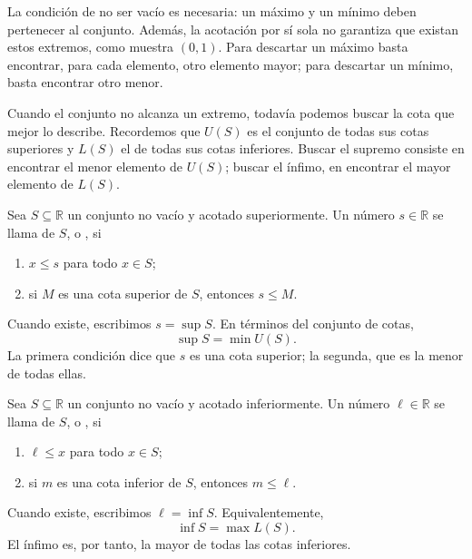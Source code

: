 \begin{remark}
La condición de no ser vacío es necesaria: un máximo y un mínimo deben pertenecer al conjunto. Además, la acotación por sí sola no garantiza que existan estos extremos, como muestra $(0,1)$. Para descartar un máximo basta encontrar, para cada elemento, otro elemento mayor; para descartar un mínimo, basta encontrar otro menor.
\end{remark}

Cuando el conjunto no alcanza un extremo, todavía podemos buscar la cota que mejor lo describe. Recordemos que $U(S)$ es el conjunto de todas sus cotas superiores y $L(S)$ el de todas sus cotas inferiores. Buscar el supremo consiste en encontrar el menor elemento de $U(S)$; buscar el ínfimo, en encontrar el mayor elemento de $L(S)$.

\begin{samepage}
\begin{definition}[Supremo]
\label{def:supremo}
Sea $S\subseteq\mathbb{R}$ un conjunto no vacío y acotado superiormente. Un número $s\in\mathbb{R}$ se llama  de $S$, o , si
\begin{enumerate}
    \item $x\leq s$ para todo $x\in S$;
    \item si $M$ es una cota superior de $S$, entonces $s\leq M$.
\end{enumerate}
Cuando existe, escribimos $s=\sup S$. En términos del conjunto de cotas,
\[
 \sup S=\min U(S).
\]
La primera condición dice que $s$ es una cota superior; la segunda, que es la menor de todas ellas.
\end{definition}
\end{samepage}

\begin{samepage}
\begin{definition}[Ínfimo]
\label{def:infimo}
Sea $S\subseteq\mathbb{R}$ un conjunto no vacío y acotado inferiormente. Un número $\ell\in\mathbb{R}$ se llama  de $S$, o , si
\begin{enumerate}
    \item $\ell\leq x$ para todo $x\in S$;
    \item si $m$ es una cota inferior de $S$, entonces $m\leq\ell$.
\end{enumerate}
Cuando existe, escribimos $\ell=\inf S$. Equivalentemente,
\[
 \inf S=\max L(S).
\]
El ínfimo es, por tanto, la mayor de todas las cotas inferiores.
\end{definition}
\end{samepage}

